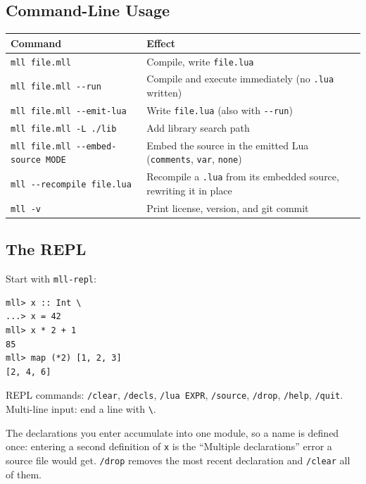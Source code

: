 \documentclass[11pt,a4paper]{article}
\begin{document}
\subsection{Command-Line Usage}

\begin{tabular}{@{}lp{}@{}}
\toprule
\textbf{Command} & \textbf{Effect} \\
\midrule
\texttt{mll file.mll}            & Compile, write \texttt{file.lua} \\
\texttt{mll file.mll -{}-run}     & Compile and execute immediately (no \texttt{.lua} written) \\
\texttt{mll file.mll -{}-emit-lua} & Write \texttt{file.lua} (also with \texttt{-{}-run}) \\
\texttt{mll file.mll -L ./lib}   & Add library search path \\
\texttt{mll file.mll -{}-embed-source MODE} & Embed the source in the emitted Lua
                                   (\texttt{comments}, \texttt{var}, \texttt{none}) \\
\texttt{mll -{}-recompile file.lua} & Recompile a \texttt{.lua} from its embedded
                                   source, rewriting it in place \\
\texttt{mll -v}                  & Print license, version, and git commit \\
\bottomrule
\end{tabular}

\subsection{The REPL}

Start with \texttt{mll-repl}:

\begin{lstlisting}[language={}]
mll> x :: Int \
...> x = 42
mll> x * 2 + 1
85
mll> map (*2) [1, 2, 3]
[2, 4, 6]
\end{lstlisting}

REPL commands: \texttt{/clear}, \texttt{/decls}, \texttt{/lua EXPR},
\texttt{/source}, \texttt{/drop}, \texttt{/help}, \texttt{/quit}.
Multi-line input: end a line with \texttt{\textbackslash}.

The declarations you enter accumulate into one module, so a name is
defined once: entering a second definition of \texttt{x} is the
``Multiple declarations'' error a source file would get.
\texttt{/drop} removes the most recent declaration and
\texttt{/clear} all of them.
\end{document}
